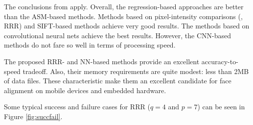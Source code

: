 \documentclass{article}
\begin{document}
		The conclusions from \cite{lbf-tip} apply.
		Overall, the regression-based approaches are better than the ASM-based methods.
		Methods based on pixel-intensity comparisons (\cite{microsoft_face_align,ERT,lbf}, RRR) and SIFT-based methods \cite{SDM,CFSS} achieve very good results.
		The methods based on convolutional neural nets \cite{CFAN,TDCNN,DCR} achieve the best results.
		However, the CNN-based methods do not fare so well in terms of processing speed.

		The proposed RRR- and NN-based methods provide an excellent accuracy-to-speed tradeoff.
		Also, their memory requirements are quite modest: less than 2MB of data files.
		These characteristic make them an excellent candidate for face alignment on mobile devices and embedded hardware.

		Some typical success and failure cases for RRR ($q=4$ and $p=7$) can be seen in Figure \ref{fig:succfail}.
\end{document}
